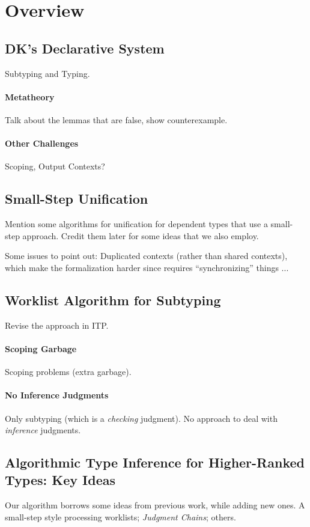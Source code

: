 \section{Overview}


\subsection{DK's Declarative System}
Subtyping and Typing. 

\paragraph{Metatheory} Talk about the lemmas that are false, show counterexample. 

\paragraph{Other Challenges} Scoping, Output Contexts?

\subsection{Small-Step Unification} Mention some algorithms for unification for 
dependent types that use a small-step approach. Credit them later for some ideas that 
we also employ.

Some issues to point out: Duplicated contexts (rather than shared contexts), which make 
the formalization harder since requires ``synchronizing'' things ...

\subsection{Worklist Algorithm for Subtyping}

Revise the approach in ITP.

\paragraph{Scoping Garbage} Scoping problems (extra garbage).

\paragraph{No Inference Judgments} 
Only subtyping (which is a \emph{checking} judgment). 
No approach to deal with \emph{inference} judgments.

\subsection{Algorithmic Type Inference for Higher-Ranked Types: Key Ideas}

Our algorithm borrows some ideas from previous work, while adding new ones. 
A small-step style processing worklists; \emph{Judgment Chains}; others. 

